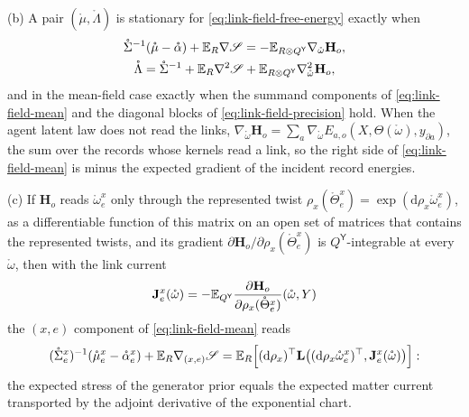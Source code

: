 (b) A pair $(\mathring\mu,\mathring\Lambda)$ is stationary for \eqref{eq:link-field-free-energy} exactly when
\begin{gather}
\mathring\Sigma^{-1}(\mathring\mu-\mathring\alpha)+\mathbb E_R\nabla\mathscr S
=-\mathbb E_{R\otimes Q^{\mathsf Y}}\nabla_{\mathring\omega}\mathbf H_o,
\label{eq:link-field-mean}\\
\mathring\Lambda=\mathring\Sigma^{-1}+\mathbb E_R\nabla^2\mathscr S+\mathbb E_{R\otimes Q^{\mathsf Y}}\nabla^2_{\mathring\omega}\mathbf H_o,
\label{eq:link-field-precision}
\end{gather}
and in the mean-field case exactly when the summand components of \eqref{eq:link-field-mean} and the
diagonal blocks of \eqref{eq:link-field-precision} hold. When the agent latent law does not read the links,
$\nabla_{\mathring\omega}\mathbf H_o=\sum_a\nabla_{\mathring\omega}E_{a,o}(X,\Theta(\mathring\omega),y_{\partial a})$, the sum over the
records whose kernels read a link, so the right side of \eqref{eq:link-field-mean} is minus the expected
gradient of the incident record energies.

(c) If $\mathbf H_o$ reads $\mathring\omega^x_e$ only through the represented twist
$\rho_x(\mathring\Theta^x_e)=\exp(\mathrm d\rho_x\mathring\omega^x_e)$, as a differentiable function of this matrix on
an open set of matrices that contains the represented twists, and its gradient
$\partial\mathbf H_o/\partial\rho_x(\mathring\Theta^x_e)$ is $Q^{\mathsf Y}$-integrable at every $\mathring\omega$, then
with the link current
\begin{equation}
\mathbf J^x_e(\mathring\omega)=-\mathbb E_{Q^{\mathsf Y}}\frac{\partial\mathbf H_o}{\partial\rho_x(\mathring\Theta^x_e)}(\mathring\omega,Y)
\label{eq:link-current}
\end{equation}
the $(x,e)$ component of \eqref{eq:link-field-mean} reads
\begin{equation}
(\mathring\Sigma^x_e)^{-1}(\mathring\mu^x_e-\mathring\alpha^x_e)+\mathbb E_R\nabla_{(x,e)}\mathscr S
=\mathbb E_R\Bigl[(\mathrm d\rho_x)^\top\mathbf L\bigl((\mathrm d\rho_x\mathring\omega^x_e)^\top,\mathbf J^x_e(\mathring\omega)\bigr)\Bigr]:
\label{eq:link-field-current}
\end{equation}
the expected stress of the generator prior equals the expected matter current transported by the adjoint
derivative of the exponential chart.

